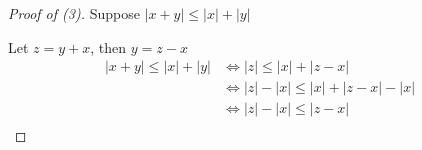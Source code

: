 \documentclass{article} %
\theoremstyle{plain}
\begin{document}
\begin{proof}[Proof of (3)]
    Suppose $|x + y| \leq |x| + |y|$

    Let $z = y + x$, then $y = z - x$
    \begin{align*}
        |x + y| \leq |x| + |y| & \iff |z| \leq |x| + |z-x| \\
        & \iff |z| - |x| \leq |x| + |z-x| - |x| \\
        & \iff |z| - |x| \leq |z-x| \\
    \end{align*}

\end{proof}



    
    
\end{document}
